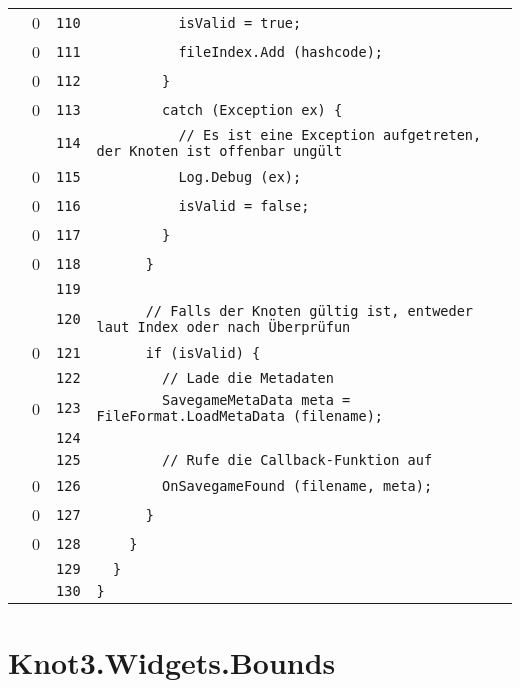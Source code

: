 \documentclass[a4paper,10pt]{article}
\begin{document}
\begin{longtable}[l]{lrrl}
\cellcolor{red} & 0 & \verb~110~ & \verb~          isValid = true;~\\
\cellcolor{red} & 0 & \verb~111~ & \verb~          fileIndex.Add (hashcode);~\\
\cellcolor{red} & 0 & \verb~112~ & \verb~        }~\\
\cellcolor{red} & 0 & \verb~113~ & \verb~        catch (Exception ex) {~\\
\cellcolor{gray} &  & \verb~114~ & \verb~          // Es ist eine Exception aufgetreten, der Knoten ist offenbar ungült~\\
\cellcolor{red} & 0 & \verb~115~ & \verb~          Log.Debug (ex);~\\
\cellcolor{red} & 0 & \verb~116~ & \verb~          isValid = false;~\\
\cellcolor{red} & 0 & \verb~117~ & \verb~        }~\\
\cellcolor{red} & 0 & \verb~118~ & \verb~      }~\\
\cellcolor{gray} &  & \verb~119~ & \verb~~\\
\cellcolor{gray} &  & \verb~120~ & \verb~      // Falls der Knoten gültig ist, entweder laut Index oder nach Überprüfun~\\
\cellcolor{red} & 0 & \verb~121~ & \verb~      if (isValid) {~\\
\cellcolor{gray} &  & \verb~122~ & \verb~        // Lade die Metadaten~\\
\cellcolor{red} & 0 & \verb~123~ & \verb~        SavegameMetaData meta = FileFormat.LoadMetaData (filename);~\\
\cellcolor{gray} &  & \verb~124~ & \verb~~\\
\cellcolor{gray} &  & \verb~125~ & \verb~        // Rufe die Callback-Funktion auf~\\
\cellcolor{red} & 0 & \verb~126~ & \verb~        OnSavegameFound (filename, meta);~\\
\cellcolor{red} & 0 & \verb~127~ & \verb~      }~\\
\cellcolor{red} & 0 & \verb~128~ & \verb~    }~\\
\cellcolor{gray} &  & \verb~129~ & \verb~  }~\\
\cellcolor{gray} &  & \verb~130~ & \verb~}~\\
\end{longtable}
\newpage
\section{Knot3.Widgets.Bounds}
\end{document}
